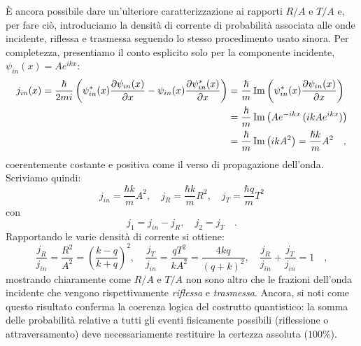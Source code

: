 È ancora possibile dare un'ulteriore caratterizzazione ai rapporti $R/A$ e $T/A$ e, per fare ciò, introduciamo la densità di corrente di probabilità associata alle onde incidente, riflessa e trasmessa seguendo lo stesso procedimento usato sinora. Per completezza, presentiamo il conto esplicito solo per la componente incidente, $\psi_{in}(x) = Ae^{ikx}$:
\[
\begin{aligned}
    j_{in}(x) = \frac{\hbar}{2mi}\left( \psi_{in}^*(x) \pdv{\psi_{in}(x)}{x} - \psi_{in}(x) \pdv{\psi_{in}^*(x)}{x} \right) &= \frac{\hbar}{m}\operatorname{Im}\left( \psi_{in}^*(x) \pdv{\psi_{in}(x)}{x} \right) \\
    &= \frac{\hbar}{m}\operatorname{Im}\left( Ae^{-ikx} \, (ik A e^{ikx}) \right) \\
    &= \frac{\hbar}{m}\operatorname{Im}\left( i k A^2 \right) = \frac{\hbar k}{m} A^2 \quad,
\end{aligned}
\]
coerentemente costante e positiva come il verso di propagazione dell'onda. Scriviamo quindi:
\[
    j_{in} = \frac{\hbar k}{m} A^2, \quad j_{R} = \frac{\hbar k}{m} R^2, \quad j_T = \frac{\hbar q}{m}T^2
\]
con 
\[
    j_1 = j_{in} - j_R, \quad j_2 = j_T \quad.
\]
Rapportando le varie densità di corrente si ottiene:
\[
    \frac{j_R}{j_{in}} = \frac{R^2}{A^2} = \left( \frac{k-q}{k+q} \right)^2, \quad \frac{j_T}{j_{in}} = \frac{qT^2}{kA^2} = \frac{4kq}{(q+k)^2}, \quad \frac{j_R}{j_{in}} + \frac{j_T}{j_{in}} = 1 \quad,
\]
mostrando chiaramente come $R/A$ e $T/A$ non sono altro che le frazioni dell'onda incidente che vengono rispettivamente \emph{riflessa} e \emph{trasmessa}. Ancora, si noti come questo risultato conferma la coerenza logica del costrutto quantistico: la somma delle probabilità relative a tutti gli eventi fisicamente possibili (riflessione o attraversamento) deve necessariamente restituire la certezza assoluta ($100 \%$).

